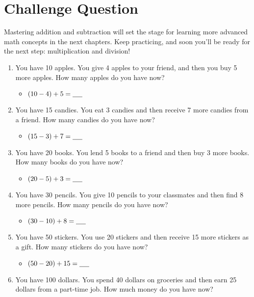 \section{Challenge Question}
Mastering addition and subtraction will set the stage for learning more advanced math concepts in the next chapters. Keep practicing, and soon you’ll be ready for the next step: multiplication and division!
\begin{enumerate}   
    \item You have 10 apples. You give 4 apples to your friend, and then you buy 5 more apples. How many apples do you have now?
    \begin{itemize}
        \item $(10 - 4) + 5 = \underline{\hspace{0.5cm}}$
    \end{itemize}
    \item You have 15 candies. You eat 3 candies and then receive 7 more candies from a friend. How many candies do you have now?
    \begin{itemize}
        \item $(15 - 3) + 7 = \underline{\hspace{0.5cm}}$
    \end{itemize}    
    \item You have 20 books. You lend 5 books to a friend and then buy 3 more books. How many books do you have now?
    \begin{itemize}
        \item $(20 - 5) + 3 = \underline{\hspace{0.5cm}}$
    \end{itemize}
    \item You have 30 pencils. You give 10 pencils to your classmates and then find 8 more pencils. How many pencils do you have now?
    \begin{itemize}
        \item $(30 - 10) + 8 = \underline{\hspace{0.5cm}}$
    \end{itemize}
    \item You have 50 stickers. You use 20 stickers and then receive 15 more stickers as a gift. How many stickers do you have now?
    \begin{itemize}
        \item $(50 - 20) + 15 = \underline{\hspace{0.5cm}}$
    \end{itemize}
    \item You have 100 dollars. You spend 40 dollars on groceries and then earn 25 dollars from a part-time job. How much money do you have now?

\end{enumerate}
